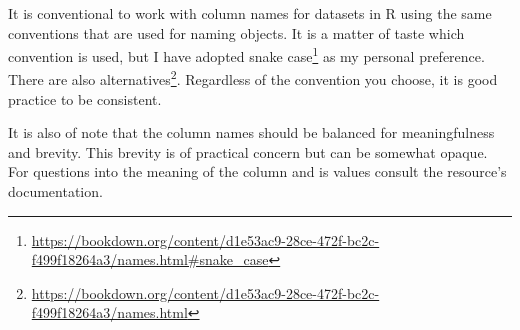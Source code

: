 \documentclass[
  letterpaper,
]{scrbook}
\DeclareRobustCommand{\href}[2]{#2\footnote{\url{#1}}}
\begin{document}
\begin{tcolorbox}[enhanced jigsaw, title=\textcolor{quarto-callout-warning-color}{\faExclamationTriangle}\hspace{0.5em}{Tip}, titlerule=0mm, toptitle=1mm, colbacktitle=quarto-callout-warning-color!10!white, bottomtitle=1mm, left=2mm, colframe=quarto-callout-warning-color-frame, breakable, toprule=.15mm, colback=white, opacitybacktitle=0.6, leftrule=.75mm, rightrule=.15mm, bottomrule=.15mm, arc=.35mm, coltitle=black, opacityback=0]

It is conventional to work with column names for datasets in R using the
same conventions that are used for naming objects. It is a matter of
taste which convention is used, but I have adopted
\href{https://bookdown.org/content/d1e53ac9-28ce-472f-bc2c-f499f18264a3/names.html\#snake_case}{snake
case} as my personal preference. There are also
\href{https://bookdown.org/content/d1e53ac9-28ce-472f-bc2c-f499f18264a3/names.html}{alternatives}.
Regardless of the convention you choose, it is good practice to be
consistent.

It is also of note that the column names should be balanced for
meaningfulness and brevity. This brevity is of practical concern but can
be somewhat opaque. For questions into the meaning of the column and is
values consult the resource's documentation.

\end{tcolorbox}
\end{document}

